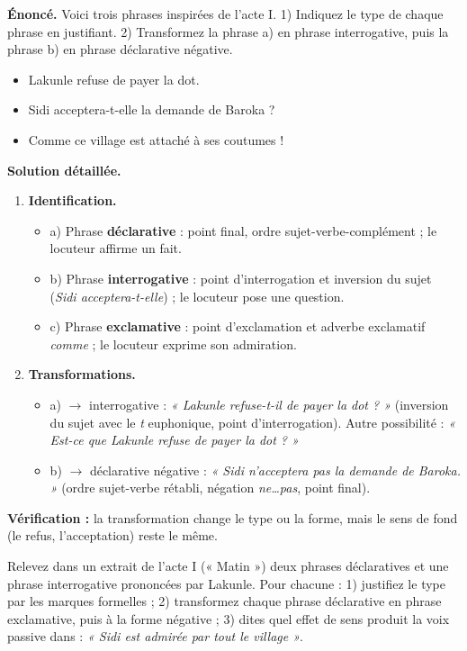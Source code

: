 \documentclass[11pt]{article}
\begin{document}
\begin{exoresolu}
\textbf{Énoncé.} Voici trois phrases inspirées de l'acte I. 1) Indiquez le type de chaque phrase en justifiant. 2) Transformez la phrase a) en phrase interrogative, puis la phrase b) en phrase déclarative négative.
\begin{itemize}
\item[a)] Lakunle refuse de payer la dot.
\item[b)] Sidi acceptera-t-elle la demande de Baroka ?
\item[c)] Comme ce village est attaché à ses coutumes !
\end{itemize}
\tcblower
\textbf{Solution détaillée.}
\begin{enumerate}
\item \textbf{Identification.}
\begin{itemize}
\item a) Phrase \textbf{déclarative} : point final, ordre sujet-verbe-complément ; le locuteur affirme un fait.
\item b) Phrase \textbf{interrogative} : point d'interrogation et inversion du sujet (\emph{Sidi acceptera-t-elle}) ; le locuteur pose une question.
\item c) Phrase \textbf{exclamative} : point d'exclamation et adverbe exclamatif \emph{comme} ; le locuteur exprime son admiration.
\end{itemize}
\item \textbf{Transformations.}
\begin{itemize}
\item a) $\rightarrow$ interrogative : \emph{« Lakunle refuse-t-il de payer la dot ? »} (inversion du sujet avec le \emph{t} euphonique, point d'interrogation). Autre possibilité : \emph{« Est-ce que Lakunle refuse de payer la dot ? »}
\item b) $\rightarrow$ déclarative négative : \emph{« Sidi n'acceptera pas la demande de Baroka. »} (ordre sujet-verbe rétabli, négation \emph{ne\ldots pas}, point final).
\end{itemize}
\end{enumerate}
\textbf{Vérification :} la transformation change le type ou la forme, mais le sens de fond (le refus, l'acceptation) reste le même.
\end{exoresolu}

\begin{exercice}
Relevez dans un extrait de l'acte I (« Matin ») deux phrases déclaratives et une phrase interrogative prononcées par Lakunle. Pour chacune : 1) justifiez le type par les marques formelles ; 2) transformez chaque phrase déclarative en phrase exclamative, puis à la forme négative ; 3) dites quel effet de sens produit la voix passive dans : \emph{« Sidi est admirée par tout le village »}.
\end{exercice}
\end{document}
